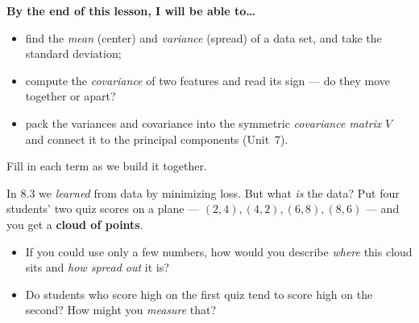 \documentclass[10pt]{article}
\begin{document}
\namedateperiod

\vspace{0.12in}

\begin{objectivebox}
\textbf{By the end of this lesson, I will be able to\dots}
\begin{itemize}\setlength{\itemsep}{2pt}
  \item find the \emph{mean} (center) and \emph{variance} (spread) of a data set, and take the standard deviation;
  \item compute the \emph{covariance} of two features and read its sign --- do they move together or apart?
  \item pack the variances and covariance into the symmetric \emph{covariance matrix} $V$ and connect it to the principal components (Unit~7).
\end{itemize}
\end{objectivebox}

\vspace{0.06in}

\begin{vocabbox}
\small
Fill in each term as we build it together.
\vspace{2pt}
\end{vocabbox}

\begin{hookbox}
In 8.3 we \emph{learned} from data by minimizing loss. But what \emph{is} the data? Put four students' two quiz
scores on a plane --- $(2,4),(4,2),(6,8),(8,6)$ --- and you get a \textbf{cloud of points}.
\begin{itemize}\setlength{\itemsep}{1pt}
  \item If you could use only a few numbers, how would you describe \emph{where} this cloud sits and \emph{how spread out} it is? 
  \item Do students who score high on the first quiz tend to score high on the second? How might you \emph{measure} that? 
\end{itemize}
\end{hookbox}
\end{document}
